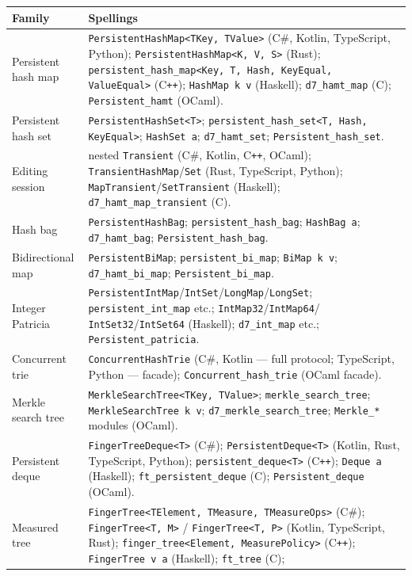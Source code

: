 \documentclass[11pt,twoside,openright]{book}
\makeatletter
\newcommand{\code}[1]{\texorpdfstring{\textcolor{d7ink}{\texttt{#1}}}{#1}}
\newenvironment{d7table}[1]
  {\par\vspace{3pt}\small
   \setlength{\LTpre}{4pt}\setlength{\LTpost}{4pt}
   \begin{longtable}{@{}%
     >{\raggedright\arraybackslash}p{#1\textwidth}%
     @{\hspace{10pt}}%
     >{\raggedright\arraybackslash}p{\dimexpr\textwidth-#1\textwidth-10pt\relax}@{}}}
  {\end{longtable}}
\newcommand{\thead}[1]{\sffamily\bfseries\footnotesize\color{d7ink}#1}
\makeatother
\begin{document}
\begin{d7table}{0.26}
\toprule
\thead{Family} & \thead{Spellings} \\
\midrule
Persistent hash map &
\code{PersistentHashMap<TKey, TValue>} (C\#, Kotlin, TypeScript, Python);
\code{PersistentHashMap<K, V, S>} (Rust);
\code{persistent\_hash\_map<Key, T, Hash, KeyEqual, ValueEqual>} (C\texttt{++});
\code{HashMap k v} (Haskell);
\code{d7\_hamt\_map} (C);
\code{Persistent\_hamt} (OCaml). \\
Persistent hash set &
\code{PersistentHashSet<T>}; \code{persistent\_hash\_set<T, Hash, KeyEqual>};
\code{HashSet a}; \code{d7\_hamt\_set}; \code{Persistent\_hash\_set}. \\
Editing session &
nested \code{Transient} (C\#, Kotlin, C\texttt{++}, OCaml);
\code{TransientHashMap}/\code{Set} (Rust, TypeScript, Python);
\code{MapTransient}/\code{SetTransient} (Haskell);
\code{d7\_hamt\_map\_transient} (C). \\
Hash bag &
\code{PersistentHashBag}; \code{persistent\_hash\_bag}; \code{HashBag a};
\code{d7\_hamt\_bag}; \code{Persistent\_hash\_bag}. \\
Bidirectional map &
\code{PersistentBiMap}; \code{persistent\_bi\_map}; \code{BiMap k v};
\code{d7\_hamt\_bi\_map}; \code{Persistent\_bi\_map}. \\
Integer Patricia &
\code{PersistentIntMap}/\code{IntSet}/\code{LongMap}/\code{LongSet};
\code{persistent\_int\_map} etc.; \code{IntMap32}/\code{IntMap64}/
\code{IntSet32}/\code{IntSet64} (Haskell); \code{d7\_int\_map} etc.;
\code{Persistent\_patricia}. \\
Concurrent trie &
\code{ConcurrentHashTrie} (C\#, Kotlin --- full protocol; TypeScript, Python ---
facade); \code{Concurrent\_hash\_trie} (OCaml facade). \\
Merkle search tree &
\code{MerkleSearchTree<TKey, TValue>}; \code{merkle\_search\_tree};
\code{MerkleSearchTree k v}; \code{d7\_merkle\_search\_tree}; \code{Merkle\_*}
modules (OCaml). \\
Persistent deque &
\code{FingerTreeDeque<T>} (C\#); \code{PersistentDeque<T>} (Kotlin, Rust,
TypeScript, Python); \code{persistent\_deque<T>} (C\texttt{++});
\code{Deque a} (Haskell); \code{ft\_persistent\_deque} (C);
\code{Persistent\_deque} (OCaml). \\
Measured tree &
\code{FingerTree<TElement, TMeasure, TMeasureOps>} (C\#);
\code{FingerTree<T, M>} / \code{FingerTree<T, P>} (Kotlin, TypeScript, Rust);
\code{finger\_tree<Element, MeasurePolicy>} (C\texttt{++});
\code{FingerTree v a} (Haskell); \code{ft\_tree} (C);

\end{d7table}
\end{document}
